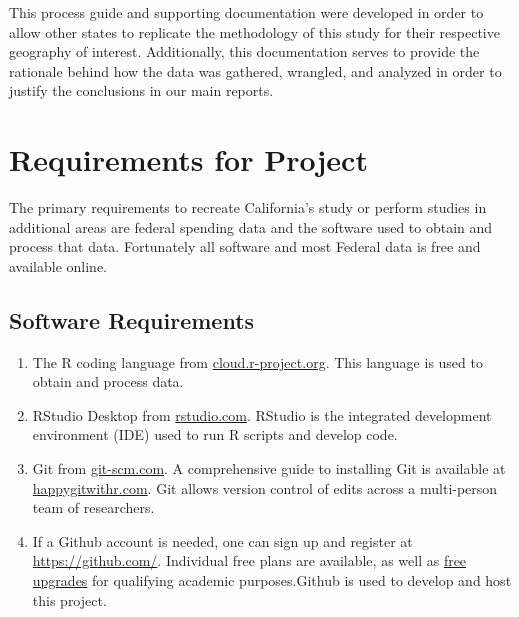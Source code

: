 \documentclass[
]{book}
\begin{document}
This process guide and supporting documentation were developed in order to allow other states to replicate the methodology of this study for their respective geography of interest. Additionally, this documentation serves to provide the rationale behind how the data was gathered, wrangled, and analyzed in order to justify the conclusions in our main reports.

\hypertarget{requirements-for-project}{%
\chapter{Requirements for Project}\label{requirements-for-project}}

The primary requirements to recreate California's study or perform studies in additional areas are federal spending data and the software used to obtain and process that data. Fortunately all software and most Federal data is free and available online.

\hypertarget{software-requirements}{%
\section{Software Requirements}\label{software-requirements}}

\begin{enumerate}
\def\labelenumi{\arabic{enumi}.}
\item
  The R coding language from \href{https://cloud.r-project.org/}{cloud.r-project.org}. This language is used to obtain and process data.
\item
  RStudio Desktop from \href{https://rstudio.com/products/rstudio/download/\#download}{rstudio.com}. RStudio is the integrated development environment (IDE) used to run R scripts and develop code.
\item
  Git from \href{https://git-scm.com/downloads}{git-scm.com}. A comprehensive guide to installing Git is available at \href{https://happygitwithr.com/install-git.html}{happygitwithr.com}. Git allows version control of edits across a multi-person team of researchers.
\item
  If a Github account is needed, one can sign up and register at \url{https://github.com/}. Individual free plans are available, as well as \href{https://help.github.com/en/articles/applying-for-an-educator-or-researcher-discount}{free upgrades} for qualifying academic purposes.Github is used to develop and host this project.
\end{enumerate}
\end{document}
